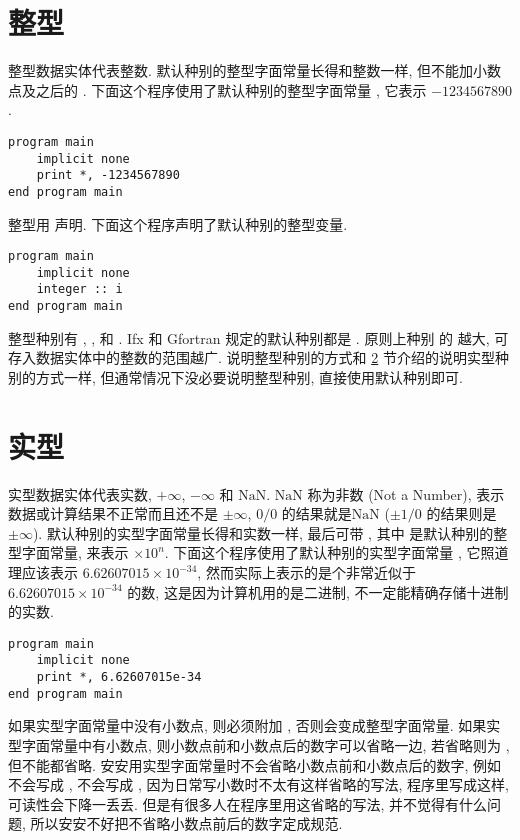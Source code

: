 \section{整型}

整型数据实体代表整数. 默认种别的整型字面常量长得和整数一样, 但不能加小数点及之后的 . 下面这个程序使用了默认种别的整型字面常量 , 它表示 $-1234567890$.
\begin{lstlisting}
program main
    implicit none
    print *, -1234567890
end program main
\end{lstlisting}

整型用  声明. 下面这个程序声明了默认种别的整型变量.
\begin{lstlisting}
program main
    implicit none
    integer :: i
end program main
\end{lstlisting}

整型种别有 , ,  和 . Ifx 和 Gfortran 规定的默认种别都是 . 原则上种别  的  越大, 可存入数据实体中的整数的范围越广. 说明整型种别的方式和 \ref{fortran_real} 节介绍的说明实型种别的方式一样, 但通常情况下没必要说明整型种别, 直接使用默认种别即可.

\section{实型}\label{fortran_real}

实型数据实体代表实数, $+\infty$, $-\infty$ 和 $\text{NaN}$. $\text{NaN}$ 称为非数 (Not a Number), 表示数据或计算结果不正常而且还不是 $\pm\infty$, $0/0$ 的结果就是$\text{NaN}$ ($\pm 1/0$ 的结果则是 $\pm\infty$). 默认种别的实型字面常量长得和实数一样, 最后可带 , 其中 \ttt{[n]} 是默认种别的整型字面常量, 来表示 $\times 10 ^ n$. 下面这个程序使用了默认种别的实型字面常量 , 它照道理应该表示 $6.62607015\times10^{-34}$, 然而实际上表示的是个非常近似于 $6.62607015\times10^{-34}$ 的数, 这是因为计算机用的是二进制, 不一定能精确存储十进制的实数.
\begin{lstlisting}
program main
    implicit none
    print *, 6.62607015e-34
end program main
\end{lstlisting}

如果实型字面常量中没有小数点, 则必须附加 , 否则会变成整型字面常量. 如果实型字面常量中有小数点, 则小数点前和小数点后的数字可以省略一边, 若省略则为 , 但不能都省略. 安安用实型字面常量时不会省略小数点前和小数点后的数字, 例如  不会写成 ,  不会写成 , 因为日常写小数时不太有这样省略的写法, 程序里写成这样, 可读性会下降一丢丢. 但是有很多人在程序里用这省略的写法, 并不觉得有什么问题, 所以安安不好把不省略小数点前后的数字定成规范. 

